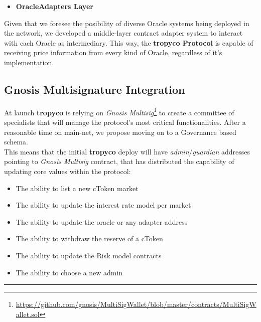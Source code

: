 \documentclass{article}
\begin{document}
\begin{itemize}
\item\textbf{OracleAdapters Layer}
\end{itemize}

Given that we foresee the posibility of diverse Oracle systems being deployed in the network, we developed a middle-layer contract adapter system to interact with each Oracle as intermediary. This way, the \textbf{tropyco Protocol} is capable of receiving price information from every kind of Oracle, regardless of it's implementation.

\subsection{Gnosis Multisignature Integration}

At launch \textbf{tropyco} is relying on \textit{Gnosis Multisig}\footnote{\href{https://github.com/gnosis/MultiSigWallet/blob/master/contracts/MultiSigWallet.sol}{https://github.com/gnosis/MultiSigWallet/blob/master/contracts/MultiSigWallet.sol}} to create a committee of specialists that will manage the protocol's most critical functionalities. After a reasonable time on main-net, we propose moving on to a Governance based schema.\\
This means that the initial \textbf{tropyco} deploy will have \textit{admin}/\textit{guardian} addresses pointing to \textit{Gnosis Multisig} contract, that has distributed the capability of updating core values within the protocol:

\begin{itemize}
\item The ability to list a new cToken market
\item The ability to update the interest rate model per market
\item The ability to update the oracle or any adapter address
\item The ability to withdraw the reserve of a cToken
\item The ability to update the Risk model contracts
\item The ability to choose a new admin
\end{itemize}

\begin{center}
\noindent\rule{8cm}{0.4pt}
\end{center}

\end{document}

